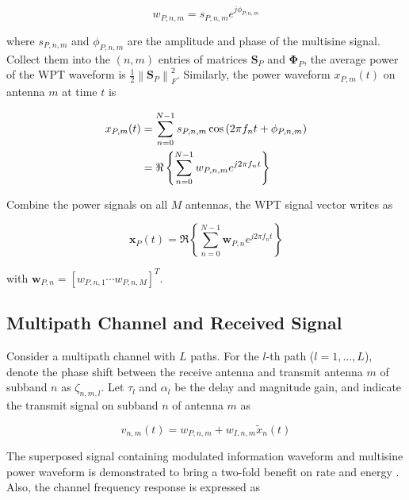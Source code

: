 \begin{equation}\label{eqn:unmodulated}
  {w_{P,n,m}} = {s_{P,n,m}}{e^{j{\phi _{P,n,m}}}}
\end{equation}

where ${s_{P,n,m}}$ and ${{\phi _{P,n,m}}}$ are the amplitude and phase of the multisine signal. Collect them into the $(n,m)$ entries of matrices ${{\mathbf{S}}_P}$ and ${{\mathbf{\Phi }}_P}$, the average power of the WPT waveform is $\frac{1}{2}\left\|\mathbf{S}_{P}\right\|_{F}^{2}$. Similarly, the power waveform ${x_{P,m}}(t)$ on antenna $m$ at time $t$ is

\begin{align}\label{eqn:power_waveform}
  {x_{P,m}}(t) &= \sum\limits_{n = 0}^{N - 1} {{s_{P,n,m}}\cos \left( {2\pi {f_n}t + {\phi _{P,n,m}}} \right)}  \hfill \\
   &= \Re \left\{ {\sum\limits_{n = 0}^{N - 1} {{w_{P,n,m}}{e^{j2\pi {f_n}t}}} } \right\} \hfill
\end{align}

Combine the power signals on all $M$ antennas, the WPT signal vector writes as

\begin{equation}\label{eqn:wpt_vector}
  {{\mathbf{x}}_P}(t) = \Re \left\{ {\sum\limits_{n = 0}^{N - 1} {{{\mathbf{w}}_{P,n}}} {e^{j2\pi {f_n}t}}} \right\}
\end{equation}

with ${{\mathbf{w}}_{P,n}} = {\left[ {{w_{P,n,1}} \cdots {w_{P,n,M}}} \right]^T}$.



\subsection{Multipath Channel and Received Signal}\label{sec:multipath-and-received-signal}
Consider a multipath channel with $L$ paths. For the $l$-th path ($l = 1, \ldots ,L$), denote the phase shift between the receive antenna and transmit antenna $m$ of subband $n$ as ${\zeta _{n,m,l}}$. Let ${\tau _l}$ and ${\alpha _l}$ be the delay and magnitude gain, and indicate the transmit signal on subband $n$ of antenna $m$ as 

\begin{equation}\label{eqn:superposed_waveform}
  {v_{n,m}}(t) = {w_{P,n,m}} + {w_{I,n,m}}{{\tilde x}_n}(t)
\end{equation}

The superposed signal containing modulated information waveform and multisine power waveform is demonstrated to bring a two-fold benefit on rate and energy \cite{Clerckx2019}. Also, the channel frequency response is expressed as

